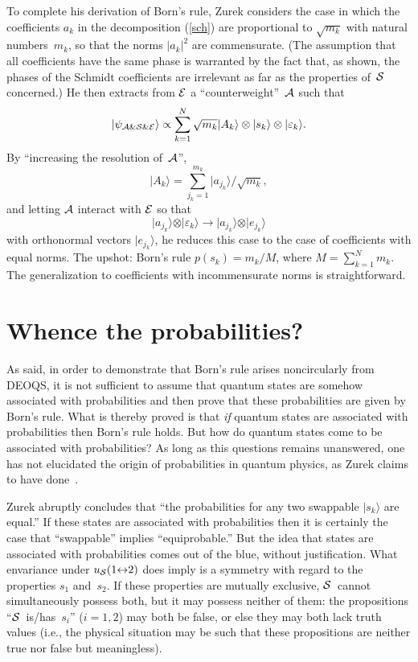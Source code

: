\documentclass[12pt]{article}
\newcommand{\ket}[1]{\vert#1\rangle}
\newcommand{\be}{\begin{equation}}
\newcommand{\ee}{\end{equation}}
\newcommand{\e}{\varepsilon}
\newcommand{\cS}{{\cal S}}
\newcommand{\E}{{\cal E}}
\newcommand{\A}{{\cal A}}
\begin{document}
To complete his derivation of Born's rule, Zurek considers the case in which the 
coefficients $a_k$ in the decomposition (\ref{sch}) are proportional to 
$\sqrt{m_k}$ with natural numbers~$m_k$, so that the norms $|a_k|^2$ are 
commensurate. (The assumption that all coefficients have the same phase is 
warranted by the fact that, as shown, the phases of the Schmidt coefficients are 
irrelevant as far as the properties of~$\cS$ concerned.) He then extracts from 
$\E$ a ``counterweight''~$\A$ such that
\be
\ket{\psi_{\A\&\cS\&\E}}\propto
\sum_{k=1}^N\sqrt{m_k}\ket{A_k}\otimes\ket{s_k}\otimes\ket{\e_k}.
\ee
By ``increasing the resolution of~$\A$'',
\be
\ket {A_k}=\sum_{j_k=1}^{m_k}\ket{a_{j_k}}/\sqrt{m_k},
\ee
and letting $\A$ interact with $\E$ so that
\be
\ket{a_{j_k}}\otimes\ket{\e_k}\rightarrow\ket{a_{j_k}}\otimes\ket{e_{j_k
}}
\ee
with orthonormal vectors $\ket{e_{j_k}}$, he reduces this case to the case of 
coefficients with equal norms. The upshot: Born's rule $p(s_k)=m_k/M$, where 
$M=\sum_{k=1}^N m_k$. The generalization to coefficients with 
incommensurate norms is straightforward.

\section{\large Whence the probabilities?}
As said, in order to demonstrate that Born's rule arises noncircularly from\break
DEOQS, it is not sufficient to assume that quantum states are somehow 
associated with probabilities and then prove that these probabilities are given by 
Born's rule. What is thereby proved is that {\it if\/} quantum states are 
associated with probabilities then Born's rule holds. But how do quantum states 
come to be associated with probabilities? As long as this questions remains 
unanswered, one has not elucidated the origin of probabilities in quantum 
physics, as Zurek claims to have done~\cite{ZurekEnv}.

Zurek abruptly concludes that ``the probabilities for any two swappable 
$\ket{s_k}$ are equal.'' If these states are associated with probabilities then it 
is certainly the case that ``swappable'' implies ``equiprobable.'' But the idea 
that states are associated with probabilities comes out of the blue, without 
justification. What envariance under $u_\cS(1{\leftrightarrow}2)$ does imply is 
a symmetry with regard to the properties $s_1$ and~$s_2$. If these properties 
are mutually exclusive, $\cS$~cannot simultaneously possess both, but it may 
possess neither of them: the propositions ``$\cS$~is/has~$s_i$'' ($i{=}1,2$) 
may both be false, or else they may both lack truth values (i.e., the physical 
situation may be such that these propositions are neither true nor false but 
meaningless).
\end{document}

